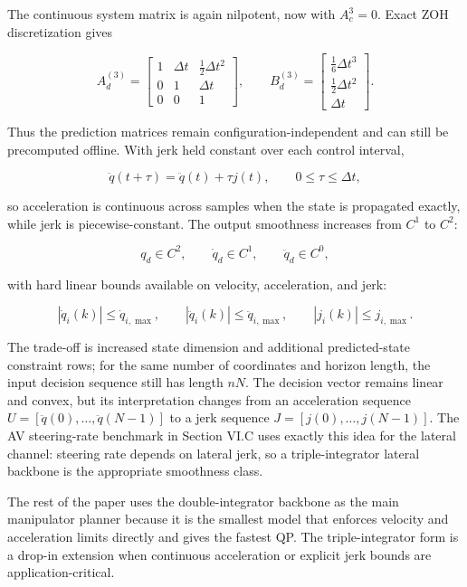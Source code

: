 The continuous system matrix is again nilpotent, now with \(A_c^3=0\).
Exact ZOH discretization gives

\[
A_d^{(3)} =
\begin{bmatrix}
1&\Delta t&\tfrac{1}{2}\Delta t^2\\
0&1&\Delta t\\
0&0&1
\end{bmatrix},
\qquad
B_d^{(3)} =
\begin{bmatrix}
\tfrac{1}{6}\Delta t^3\\
\tfrac{1}{2}\Delta t^2\\
\Delta t
\end{bmatrix}.
\]

Thus the prediction matrices remain configuration-independent and can
still be precomputed offline. With jerk held constant over each control
interval,

\[
\ddot q(t+\tau)=\ddot q(t)+\tau j(t),\qquad 0\leq \tau\leq \Delta t,
\]

so acceleration is continuous across samples when the state is
propagated exactly, while jerk is piecewise-constant. The output
smoothness increases from \(C^1\) to \(C^2\):

\[q_d\in C^2,\qquad \dot q_d\in C^1,\qquad \ddot q_d\in C^0,\]

with hard linear bounds available on velocity, acceleration, and jerk:

\[|\dot q_i(k)|\leq \dot q_{i,\max},\qquad
|\ddot q_i(k)|\leq \ddot q_{i,\max},\qquad
|j_i(k)|\leq j_{i,\max}.\]

The trade-off is increased state dimension and additional
predicted-state constraint rows; for the same number of coordinates and
horizon length, the input decision sequence still has length \(nN\). The
decision vector remains linear and convex, but its interpretation
changes from an acceleration sequence
\(U=[\ddot q(0),\dots,\ddot q(N-1)]\) to a jerk sequence
\(J=[j(0),\dots,j(N-1)]\). The AV steering-rate benchmark in Section
VI.C uses exactly this idea for the lateral channel: steering rate
depends on lateral jerk, so a triple-integrator lateral backbone is the
appropriate smoothness class.

The rest of the paper uses the double-integrator backbone as the main
manipulator planner because it is the smallest model that enforces
velocity and acceleration limits directly and gives the fastest QP. The
triple-integrator form is a drop-in extension when continuous
acceleration or explicit jerk bounds are application-critical.

